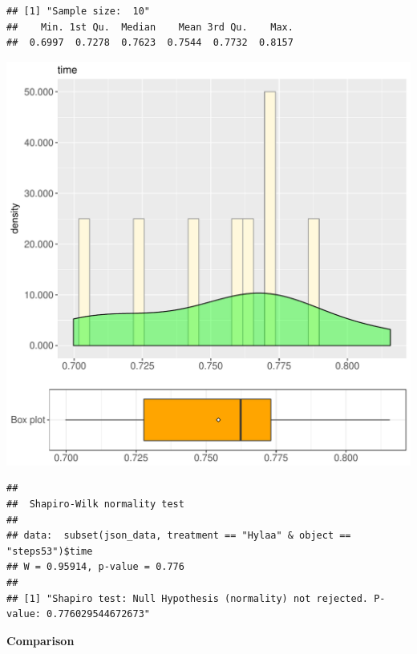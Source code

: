\documentclass{article}\usepackage[]{graphicx}\usepackage[]{color}
\makeatletter
\def\maxwidth{ %
  \ifdim\Gin@nat@width>\linewidth
    \linewidth
  \else
    \Gin@nat@width
  \fi
}
\newenvironment{kframe}{%
 \def\at@end@of@kframe{}%
 \ifinner\ifhmode%
  \def\at@end@of@kframe{\end{minipage}}%
  \begin{minipage}{\columnwidth}%
 \fi\fi%
 \def\FrameCommand##1{\hskip\@totalleftmargin \hskip-\fboxsep
 \colorbox{shadecolor}{##1}\hskip-\fboxsep
     \hskip-\linewidth \hskip-\@totalleftmargin \hskip\columnwidth}%
 \MakeFramed {\advance\hsize-\width
   \@totalleftmargin\z@ \linewidth\hsize
   \@setminipage}}%
 {\par\unskip\endMakeFramed%
 \at@end@of@kframe}
\newenvironment{knitrout}{}{} %
\makeatother
\begin{document}
\begin{knitrout}
\color{fgcolor}\begin{kframe}
\begin{verbatim}
## [1] "Sample size:  10"
##    Min. 1st Qu.  Median    Mean 3rd Qu.    Max. 
##  0.6997  0.7278  0.7623  0.7544  0.7732  0.8157
\end{verbatim}
\end{kframe}
\includegraphics[width=\maxwidth]{figure/RH3_Hylaa_steps53-1} 
\begin{kframe}\begin{verbatim}
## 
## 	Shapiro-Wilk normality test
## 
## data:  subset(json_data, treatment == "Hylaa" & object == "steps53")$time
## W = 0.95914, p-value = 0.776
## 
## [1] "Shapiro test: Null Hypothesis (normality) not rejected. P-value: 0.776029544672673"
\end{verbatim}
\end{kframe}
\end{knitrout}
  
 \textbf{Comparison}
  
\end{document}
